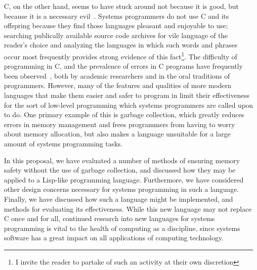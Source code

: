 \documentclass[11pt,a4paper]{article}
\theoremstyle{break}
\begin{document}
C, on the other hand, seems to have stuck around not because it is good, but because it is a necessary evil~\cite{Shapiro:2006:PLC:1215995.1216004}. Systems programmers do not use C and its offspring because they find those languages pleasant and enjoyable to use; searching publically available source code archives for vile language of the reader's choice and analyzing the languages in which such words and phrases occur most frequently provides strong evidence of this fact\footnote{I invite the reader to partake of such an activity at their own discretion}. The difficulty of programming in C, and the prevalence of errors in C programs have frequently been observed~\cite{Shapiro:2006:PLC:1215995.1216004,Bhattacharya:2011:APL:1985793.1985817,Ray:2014:LSS:2635868.2635922}, both by academic researchers and in the oral traditions of programmers. However, many of the features and qualities of more modern languages that make them easier and safer to program in limit their effectiveness for the sort of low-level programming which systems programmers are called upon to do. One primary example of this is garbage collection, which greatly reduces errors in memory management and frees programmers from having to worry about memory allocation, but also makes a language unsuitable for a large amount of systems programming tasks.

In this proposal, we have evaluated a number of methods of ensuring memory safety without the use of garbage collection, and discussed how they may be applied to a Lisp-like programming language. Furthermore, we have considered other design concerns necessary for systems programming in such a language. Finally, we have discussed how such a language might be implemented, and methods for evaluating its effectiveness. While this new language may not replace C once and for all, continued research into new languages for systems programming is vital to the health of computing as a discipline, since systems software has a great impact on all applications of computing technology.

\pagebreak
\begingroup
\setlength{\emergencystretch}{1em} %
\printbibliography
\endgroup
\end{document}
